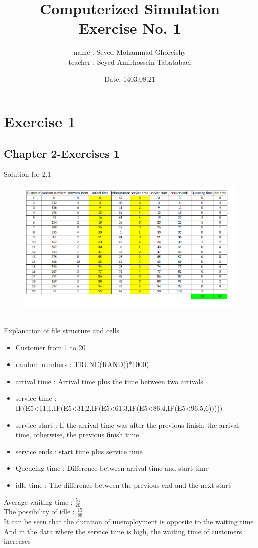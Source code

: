 \documentclass[a4paper,12pt]{article}
\title{Computerized Simulation \\
Exercise No. 1}
\author{name : Seyed Mohammad Ghoreishy \\ teacher : Seyed Amirhossein Tabatabaei }
\date{Date: 1403.08.21}
\begin{document}
\maketitle
\tableofcontents 
\newpage
\section{Exercise 1}
\subsection{Chapter 2-Exercises 1}
Solution for 2.1
\begin{figure}[h!]
    \centering
    \includegraphics[width=1\textwidth]{./Screenshots/Exercise1.1.xlsx.png} 
\end{figure} \\
Explanation of file structure and cells
\begin{itemize}
    \item Customer from 1 to 20 
    \item random numbers : TRUNC(RAND()*1000)
    \item arrival time   : Arrival time plus the time between two arrivals
    \item service time   : IF(E5\textless11,1,IF(E5\textless31,2,IF(E5\textless61,3,IF(E5\textless86,4,IF(E5\textless96,5,6)))))
    \item service start  : If the arrival time was after the previous finish: the arrival time, otherwise, the previous finish time
    \item service ends   : start time plus service time 
    \item Queueing time  : Difference between arrival time and start time
    \item idle time      : The difference between the previous end and the next start
\end{itemize}
Average waiting time : \(\frac{51}{20} \) \\
The possibility of idle : \(\frac{15}{88} \) \\
It can be seen that the duration of unemployment is opposite to the waiting time
And in the data where the service time is high, the waiting time of customers increases
\newpage
\end{document}
